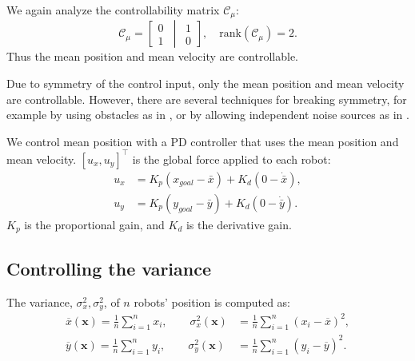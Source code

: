 We again analyze the controllability matrix $\mathcal{C}_{\mu}$:
\begin{equation}
\mathcal{C}_\mu=\left[ \begin{matrix} 
0\\
1
\end{matrix}
\,\middle\vert\,
 \begin{matrix} 
1\\
0
\end{matrix}
 \right],  \quad \textrm{rank}(\mathcal{C}_\mu)=2.
\end{equation}
Thus the mean position and mean velocity are controllable.


Due to symmetry of the control input, only the mean position and mean velocity are controllable. However, there are several techniques for breaking symmetry, for example by using obstacles as in \cite{Becker2013b}, or by allowing independent noise sources as in \cite{beckerIJRR2014}.

We control mean position with a PD controller that uses the mean position and mean velocity. $[u_x,u_y]^\top$ is the global force applied to each robot:
\begin{align}
u_x &= K_{p}(x_{goal} - \bar{x}) + K_{d}(0-\dot{\bar{x}}), \nonumber\\
u_y &= K_{p}(y_{goal}  - \bar{y}) + K_{d}(0-\dot{\bar{y}}).  \label{eq:PDcontrolPosition}
\end{align}
 $K_{p}$ is the proportional gain, and $K_{d}$ is the derivative gain. 


\subsection{Controlling the variance}\label{sec:VarianceControl}

The variance, $\sigma_x^2,\sigma_y^2$, of $n$ robots' position is computed as:
\begin{align}\label{eq:meanVar}
 \overline{x}(\mathbf{x}) = \frac{1}{n} \sum_{i=1}^n x_{i}, \qquad  %
\sigma_x^2(\mathbf{x}) &= \frac{1}{n} \sum_{i=1}^n (x_{i} - \overline{x})^2,  \nonumber \\ 
 \overline{y}(\mathbf{x}) = \frac{1}{n} \sum_{i=1}^n y_{i}, \qquad  %
\sigma_y^2(\mathbf{x}) &= \frac{1}{n} \sum_{i=1}^n (y_{i} - \overline{y})^2.  
\end{align}

